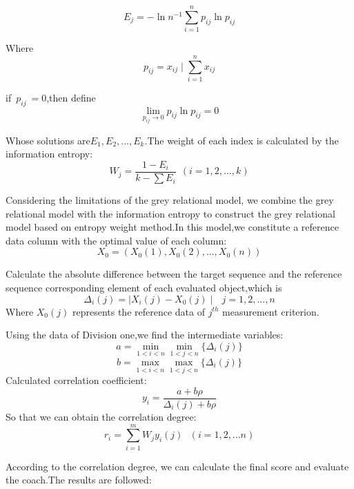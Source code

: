 \documentclass{mcmthesis}
\begin{document}
 \begin{equation}
 {E}_{j}=-\ln {{n}^{-1}} \sum_{i=1}^{n}{p}_{ij}\ln{ {p}_{ij}}
 \end{equation}
 
Where
\begin{equation}
{p}_{ij}={x}_{ij}\mid \sum_{i=1}^{n}{x}_{ij}
\end{equation}
\par if~${p}_{ij}~=0$,then define
\begin{equation}
\lim_{{p}_{ij}\rightarrow 0}{p}_{ij}\ln {{p}_{ij}}=0
\end{equation}
\par Whose solutions are${E}_{1},{E}_{2},...,{E}_{k}$.The weight of each index is calculated by the information entropy:
\begin{equation}
{W}_{j}=\frac{1-{E}_{i}}{k-\sum{E}_{i}} ~~(i=1,2,...,k)
\end{equation}
\par Considering the limitations of the grey relational model, we combine the grey relational model with the information entropy to construct the grey relational model based on entropy weight method.In this model,we constitute a reference data column with the optimal value of each column:
\begin{equation}
{X}_{0}=({X}_{0}(1), {X}_{0}(2),..., {X}_{0}(n))
\end{equation}
\par Calculate the absolute difference between the target sequence and the reference sequence corresponding element of each evaluated object,which is
\begin{equation}
{\Delta }_{i}(j)=\mid {X}_{i}(j)-{X}_{0}(j)\mid ~~~j=1,2,...,n
\end{equation}
Where ${X}_{0}(j)$ represents the reference data of ${j}^{th}$ measurement criterion.
\par Using the data of Division one,we find the intermediate variables:
\begin{equation}
a=\min \limits_{1<i<n} \min \limits_{1<j<n}\{{\Delta }_{i}(j)\}
\end{equation}
\begin{equation}
b=\max \limits_{1<i<n} \max \limits_{1<j<n}\{{\Delta }_{i}(j)\}
\end{equation}
Calculated correlation coefficient:
\begin{equation}
{y}_{i}=\frac{a+b\rho }{{\Delta }_{i}(j)+b\rho }
\end{equation}
So that we can obtain the correlation degree:
\begin{equation}
{r}_{i}=\sum_{i=1}^{m}{W}_{j}{y}_{i}(j)~~~(i=1,2,...n)
\end{equation}
\par According to the correlation degree, we can calculate the final score and evaluate the coach.The results are followed:
\end{document}
